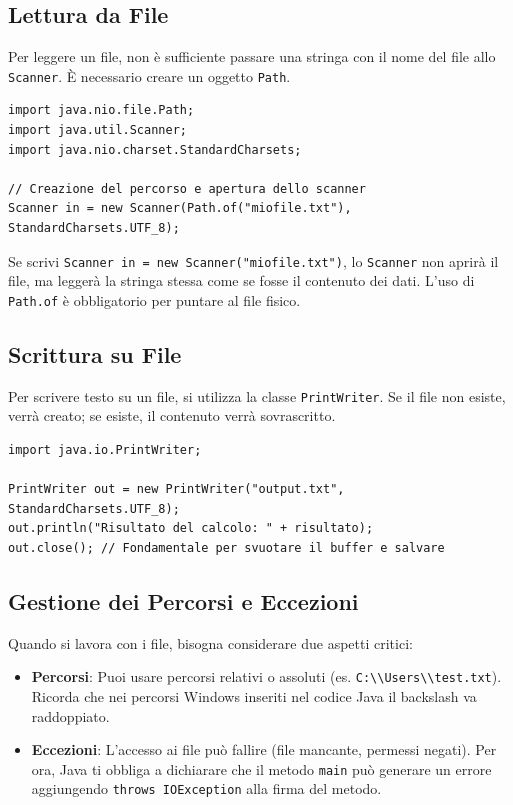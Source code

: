 \subsection{Lettura da File}

Per leggere un file, non è sufficiente passare una stringa con il nome del file allo \texttt{Scanner}. È necessario creare un oggetto \texttt{Path}.

\begin{lstlisting}[caption={Lettura corretta di un file}]
import java.nio.file.Path;
import java.util.Scanner;
import java.nio.charset.StandardCharsets;

// Creazione del percorso e apertura dello scanner
Scanner in = new Scanner(Path.of("miofile.txt"), StandardCharsets.UTF_8);
\end{lstlisting}

\begin{warningbox}[]
Se scrivi \texttt{Scanner in = new Scanner("miofile.txt")}, lo \texttt{Scanner} non aprirà il file, ma leggerà la stringa stessa come se fosse il contenuto dei dati. L'uso di \texttt{Path.of} è obbligatorio per puntare al file fisico.
\end{warningbox}

\subsection{Scrittura su File}

Per scrivere testo su un file, si utilizza la classe \texttt{PrintWriter}. Se il file non esiste, verrà creato; se esiste, il contenuto verrà sovrascritto.

\begin{lstlisting}[caption={Scrittura su file}]
import java.io.PrintWriter;

PrintWriter out = new PrintWriter("output.txt", StandardCharsets.UTF_8);
out.println("Risultato del calcolo: " + risultato);
out.close(); // Fondamentale per svuotare il buffer e salvare
\end{lstlisting}

\subsection{Gestione dei Percorsi e Eccezioni}

Quando si lavora con i file, bisogna considerare due aspetti critici:

\begin{itemize}
    \item \textbf{Percorsi}: Puoi usare percorsi relativi o assoluti (es. \texttt{C:\textbackslash\textbackslash Users\textbackslash\textbackslash test.txt}). Ricorda che nei percorsi Windows inseriti nel codice Java il backslash va raddoppiato.
    \item \textbf{Eccezioni}: L'accesso ai file può fallire (file mancante, permessi negati). Per ora, Java ti obbliga a dichiarare che il metodo \texttt{main} può generare un errore aggiungendo \texttt{throws IOException} alla firma del metodo.
\end{itemize}



